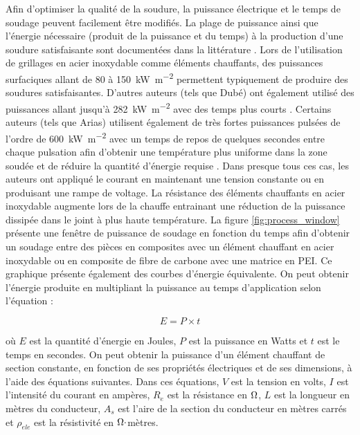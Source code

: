 \FloatBarrier
Afin d'optimiser la qualité de la soudure, la puissance électrique et le temps de soudage peuvent facilement être modifiés. 
La plage de puissance ainsi que l'énergie nécessaire (produit de la puissance et du temps) à la production d'une soudure satisfaisante sont documentées dans la littérature \cite{Hou1999a}. 
Lors de l'utilisation de grillages en acier inoxydable comme éléments chauffants, des puissances surfaciques allant de 80 à \SI[locale=FR]{150}{\kilo\watt\per\square\metre} permettent typiquement de produire des soudures satisfaisantes. 
D'autres auteurs (tels que Dubé) ont également utilisé des puissances allant jusqu'à \SI[locale=FR]{282}{\kilo\watt\per\square\metre} avec des temps plus courts \cite{Dube2007}. 
Certains auteurs (tels que Arias) utilisent également de très fortes puissances pulsées de l'ordre de \SI[locale=FR]{600}{\kilo\watt\per\square\metre} avec un temps de repos de quelques secondes entre chaque pulsation afin d'obtenir une température plus uniforme dans la zone soudée et de réduire la quantité d'énergie requise  \cite{Arias1996}. 
Dans presque tous ces cas, les auteurs ont appliqué le courant en maintenant une tension constante ou en produisant une rampe de voltage. 
La résistance des éléments chauffants en acier inoxydable augmente lors de la chauffe entrainant une réduction de la puissance dissipée dans le joint à plus haute température. 
La figure \ref{fig:process_window} présente une fenêtre de puissance de soudage en fonction du temps afin d'obtenir un soudage entre des pièces en composites avec un élément chauffant en acier inoxydable ou en composite de fibre de carbone avec une matrice en PEI. 
Ce graphique présente également des courbes d'énergie équivalente. 
On peut obtenir l'énergie produite en multipliant la puissance au temps d'application selon l'équation : 

\begin{equation}
E = P \times t
\end{equation}

où $E$ est la quantité d'énergie en Joules, $P$ est la puissance en Watts et $t$ est le temps en secondes. 
On peut obtenir la puissance d'un élément chauffant de section constante, en fonction de ses propriétés électriques et de ses dimensions, à l'aide des équations suivantes. Dans ces équations, $V$ est la tension en volts, $I$ est l'intensité du courant en ampères, $R_e$ est la résistance en $\ohm$, $L$ est la longueur en mètres du conducteur, $A_s$ est l'aire de la section du conducteur en mètres carrés et $\rho_{ele}$ est la résistivité en $\ohm \cdot$mètres. 

